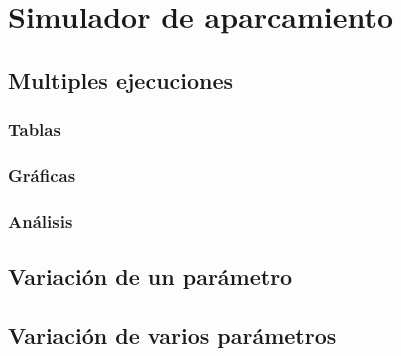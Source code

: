 \chapter{Simulador de aparcamiento}
\section{Multiples ejecuciones}
\subsection{Tablas}
\subsection{Gráficas}
\subsection{Análisis}
\section{Variación de un parámetro}
\section{Variación de varios parámetros}
